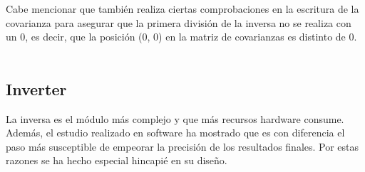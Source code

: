 Cabe mencionar que también realiza ciertas comprobaciones en la escritura de la covarianza para asegurar que la primera división de la inversa no se realiza con un 0, es decir, que la posición (0, 0) en la matriz de covarianzas es distinto de 0.
\\
\\
%
%
%
%
%
%
%

\subsection{Inverter}
La inversa es el módulo más complejo y que más recursos hardware consume. Además, el estudio realizado en software ha mostrado que es con diferencia el paso más susceptible de empeorar la precisión de los resultados finales. Por estas razones se ha hecho especial hincapié en su diseño.

